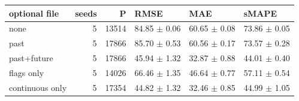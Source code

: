\begin{tabular}{lrrlll}
\toprule
optional file & seeds & P & RMSE & MAE & sMAPE \\
\midrule
none & 5 & 13514 & 84.85 $\pm$ 0.06 & 60.65 $\pm$ 0.08 & 73.86 $\pm$ 0.05 \\
past & 5 & 17866 & 85.70 $\pm$ 0.53 & 60.56 $\pm$ 0.17 & 73.57 $\pm$ 0.28 \\
past+future & 5 & 17866 & 45.94 $\pm$ 1.32 & 32.87 $\pm$ 0.88 & 44.01 $\pm$ 0.40 \\
flags only & 5 & 14026 & 66.46 $\pm$ 1.35 & 46.64 $\pm$ 0.77 & 57.11 $\pm$ 0.54 \\
continuous only & 5 & 17354 & 44.82 $\pm$ 1.32 & 32.46 $\pm$ 0.85 & 44.99 $\pm$ 1.05 \\
\bottomrule
\end{tabular}
